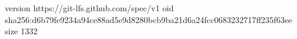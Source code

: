 version https://git-lfs.github.com/spec/v1
oid sha256:d6b79fe9234a94ce88ad5e9d8280bcb9ba21d6a24fcc0683232717ff235f63ee
size 1332
